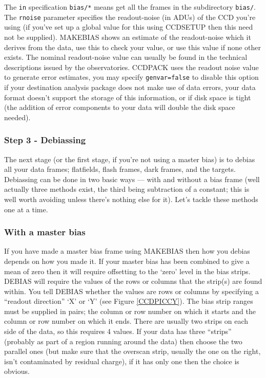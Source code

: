\documentclass[twoside,11pt]{article}
\newcommand{\htmlref}[2]{#1}
\newcommand{\xlabel}[1]{}
\renewcommand{\_}{\texttt{\symbol{95}}}
\newcommand{\text}[1]{{\small \tt #1}}
\newcommand{\routine}[1]{{\sc #1}}
\newcommand{\xroutine}[1]{\htmlref{{\sc #1}}{#1}}
\begin{document}
The \text{in} specification \text{bias/*} means get all the frames
in the subdirectory \text{bias/}.
The \text{rnoise} parameter specifies the readout-noise (in ADUs) of
the CCD you're using (if you've set up a global value for this using
\xroutine{CCDSETUP} then this need not be supplied).
\routine{MAKEBIAS} shows an estimate of the readout-noise which it derives from
the data, use this to check your value, or use this value if none
other exists.
The nominal readout-noise value can usually be found in the technical
descriptions issued by the observatories.
CCDPACK uses the readout noise value to generate error estimates, you
may specify \text{genvar=false} to disable this option if your
destination analysis package does not make use of data errors, your
data format doesn't support the storage of this information, or if
disk space is tight (the addition of error components to your data
will double the disk space needed).

\subsubsection{\xlabel{debiassing}Step 3 - Debiassing}

The next stage (or the first stage, if you're not using a master bias)
is to debias all your data frames; flatfields, flash frames, dark
frames, and the targets.
Debiassing can be done in two basic ways --- with and without a bias
frame (well actually three methods exist, the third being subtraction
of a constant; this is well worth avoiding unless there's nothing else
for it).
Let's tackle these methods one at a time.

\subsubsection{With a master bias}

If you have made a master bias frame using \xroutine{MAKEBIAS} then how you
debias depends on how you made it.
If your master bias has been combined to give a mean of zero then it will
require offsetting to the `zero' level in the bias strips.
\xroutine{DEBIAS} will require the values of the rows or columns that the strip(s)
are found within.
You tell \routine{DEBIAS} whether the values are rows or columns by specifying a
``readout direction'' `X' or `Y' (see Figure \ref{CCDPICCY}).
The bias strip ranges must be supplied in pairs; the column or row
number on which it starts and the column or row number on which it ends.
There are usually two strips on each side of the data, so this
requires 4 values.
If your data has three ``strips'' (probably as part of a region
running around the data) then choose the two parallel ones (but make
sure that the overscan strip, usually the one on the right, isn't
contaminated by residual charge), if it has only one then the choice
is obvious.
\end{document}
